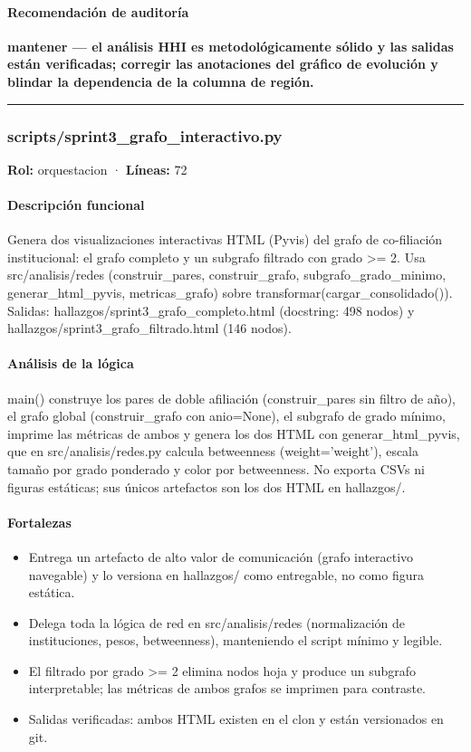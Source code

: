 \paragraph{Recomendación de auditoría}
\textbf{mantener --- el análisis HHI es metodológicamente sólido y las salidas están verificadas; corregir las anotaciones del gráfico de evolución y blindar la dependencia de la columna de región.}

\medskip
\hrule

\subsubsection{scripts/sprint3\_grafo\_interactivo.py}
\textbf{Rol:} orquestacion · \textbf{Líneas:} 72

\paragraph{Descripción funcional}
Genera dos visualizaciones interactivas HTML (Pyvis) del grafo de co-filiación institucional: el grafo completo y un subgrafo filtrado con grado >= 2. Usa src/analisis/redes (construir\_pares, construir\_grafo, subgrafo\_grado\_minimo, generar\_html\_pyvis, metricas\_grafo) sobre transformar(cargar\_consolidado()). Salidas: hallazgos/sprint3\_grafo\_completo.html (docstring: 498 nodos) y hallazgos/sprint3\_grafo\_filtrado.html (146 nodos).

\paragraph{Análisis de la lógica}
main() construye los pares de doble afiliación (construir\_pares sin filtro de año), el grafo global (construir\_grafo con anio=None), el subgrafo de grado mínimo, imprime las métricas de ambos y genera los dos HTML con generar\_html\_pyvis, que en src/analisis/redes.py calcula betweenness (weight='weight'), escala tamaño por grado ponderado y color por betweenness. No exporta CSVs ni figuras estáticas; sus únicos artefactos son los dos HTML en hallazgos/.

\paragraph{Fortalezas}
\begin{itemize}
  \item Entrega un artefacto de alto valor de comunicación (grafo interactivo navegable) y lo versiona en hallazgos/ como entregable, no como figura estática.
  \item Delega toda la lógica de red en src/analisis/redes (normalización de instituciones, pesos, betweenness), manteniendo el script mínimo y legible.
  \item El filtrado por grado >= 2 elimina nodos hoja y produce un subgrafo interpretable; las métricas de ambos grafos se imprimen para contraste.
  \item Salidas verificadas: ambos HTML existen en el clon y están versionados en git.
\end{itemize}

